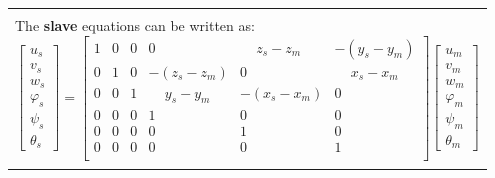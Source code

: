 \documentclass[10pt,b5paper,titlepage]{book}
\newenvironment{bbox}[1][0.96]
{
    \begin{center}
        \begin{tabular}{|p{#1\textwidth}|}
            \hline\\
}
{
            \\\\\hline
        \end{tabular}
    \end{center}
}
\begin{document}
\begin{bbox}[0.95]
    The \textbf{slave} equations can be written as:
    \begin{equation}
        \begin{bmatrix}
            u_s \\
            v_s \\
            w_s \\
            \varphi_s \\
            \psi_s \\
            \theta_s
        \end{bmatrix}
        = \begin{bmatrix}
            1 & 0 & 0 & 0 & \phantom{-(}z_s - z_m & -(y_s - y_m) \\
            0 & 1 & 0 & -(z_s - z_m) & 0 & \phantom{-(}x_s - x_m \\
            0 & 0 & 1 & \phantom{-(}y_s - y_m & -(x_s - x_m) & 0 \\
            0 & 0 & 0 & 1 & 0 & 0 \\
            0 & 0 & 0 & 0 & 1 & 0 \\
            0 & 0 & 0 & 0 & 0 & 1 \\
        \end{bmatrix}
        \begin{bmatrix}
            u_m \\
            v_m \\
            w_m \\
            \varphi_m \\
            \psi_m \\
            \theta_m
        \end{bmatrix}
    \end{equation}


\end{bbox}
\end{document}
